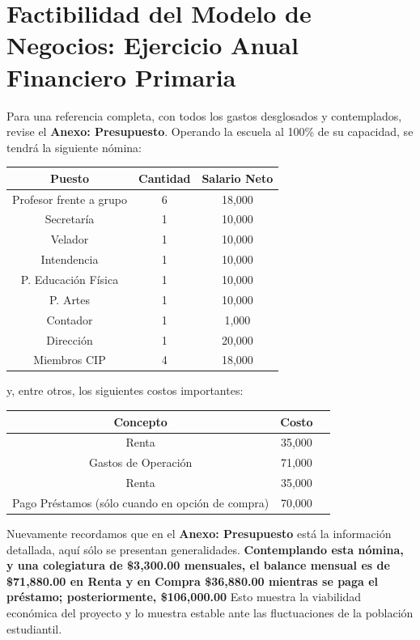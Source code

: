 \documentclass[10pt,letterpaper,oneside]{book}
\begin{document}
\section{Factibilidad del Modelo de Negocios: Ejercicio Anual Financiero Primaria}

Para una referencia completa, con todos los gastos desglosados y contemplados, revise el {\bf Anexo: Presupuesto}. Operando la escuela al 100\% de su capacidad, se tendrá la siguiente nómina:

\begin{center}
\begin{tabular}{|c|c|c|}
\hline 
{\bf Puesto} & {\bf Cantidad} & {\bf Salario Neto} \\ 
\hline 
Profesor frente a grupo & 6 & 18,000 \\ 
\hline 
Secretaría & 1 & 10,000 \\ 
\hline 
Velador & 1 & 10,000 \\ 
\hline 
Intendencia & 1 & 10,000 \\ 
\hline 
P. Educación Física & 1 & 10,000 \\ 
\hline 
P. Artes & 1 & 10,000 \\ 
\hline 
Contador & 1 & 1,000 \\ 
\hline 
Dirección & 1 & 20,000 \\ 
\hline 
Miembros CIP & 4 & 18,000 \\ 
\hline 
\end{tabular} 
\end{center}
y, entre otros, los siguientes costos importantes:

\begin{center}
\begin{tabular}{|c|c|c|}
\hline 
{\bf Concepto} & {\bf Costo}  \\ 
\hline 
Renta & 35,000 \\ 
\hline 
Gastos de Operación & 71,000 \\ 
\hline 
Renta & 35,000 \\ 
\hline 
Pago Préstamos (sólo cuando en opción de compra) & 70,000 \\ 
\hline 
\end{tabular} 
\end{center}
\vspace{0.3cm}
Nuevamente recordamos que en el {\bf Anexo: Presupuesto} está la información detallada, aquí sólo se presentan generalidades. {\bf\large \color{red} Contemplando esta nómina, y una colegiatura de \$3,300.00 mensuales, el balance mensual es de \$71,880.00 en Renta y en Compra \$36,880.00  mientras se paga el préstamo; posteriormente, \$106,000.00}
Esto muestra la viabilidad económica del proyecto y lo muestra estable ante las fluctuaciones de la población estudiantil.
\vspace{0.3cm}
\end{document}
